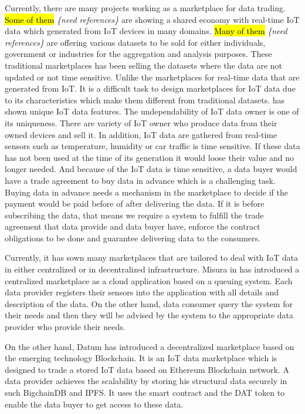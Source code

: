 \documentclass[letterpaper, 10 pt, conference]{ieeeconf}  %
\newcommand{\mycomment}[2]{\hl{#1} {{\leavevmode\smaller\color{red}\itshape\{#2\}}}}
\begin{document}
Currently, there are many projects working as a marketplace for data trading. \mycomment{Some of them}{need references} are showing a shared economy with real-time IoT data which generated from IoT devices in many domains. \mycomment{Many of them}{need references} are offering various datasets to be sold for either individuals, government or industries for the aggregation and analysis purposes. These traditional marketplaces has been selling the datasets where the data are not updated or not time sensitive. Unlike the marketplaces for real-time data that are generated from IoT. It is a difficult task to  design marketplaces for IoT data due to its characteristics which make them different from traditional datasets. \cite{misura} has shown unique IoT data features. The undependability of IoT data owner is one of its uniqueness. There are variety of IoT owner who produce data from their owned devices and sell it. In addition, IoT data are gathered from real-time sensors such as temperature, humidity or car traffic is time sensitive. If these data has not been used at the time of its generation it would loose their value and no longer needed. And because of the IoT data is time sensitive, a data buyer would have a trade agreement to buy data in advance which is a challenging task. Buying data in advance needs a mechanism in the marketplace to decide if the payment would be paid before of after delivering the data. If it is before subscribing the data, that means we require a system to fulfill the trade agreement that data provide and data buyer have, enforce the contract obligations to be done and guarantee delivering data to the consumers.

Currently, it has sown many marketplaces that are tailored to deal with IoT data in either centralized or in decentralized infrastructure. Misura in \cite{misura} has introduced a centralized marketplace as a cloud application based on a queuing system. Each data provider registers their sensors into the application with all details and description of the data. On the other hand, data consumer query the system for their needs and then  they will be advised by the system to the appropriate data provider who provide their needs. 

On the other hand, Datum \cite{24} has introduced a decentralized marketplace based on the emerging technology Blockchain. It is an IoT data marketplace which is designed to trade a stored IoT data based on Ethereum Blockchain network. A data provider achieves the scalability by storing his structural data securely in such BigchainDB and IPFS.  It uses the smart contract and the DAT token to enable the data buyer to get access to these data. 
\end{document}

